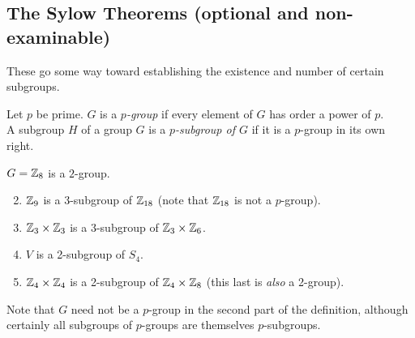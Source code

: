 \clearpage

\iffalse

\subsection{The Sylow Theorems (optional and non-examinable)}

These go some way toward establishing the existence and number of certain subgroups.

\begin{defn}{}{}
	Let $p$ be prime. $G$ is a \emph{$p$-group} if every element of $G$ has order a power of $p$.\\
A subgroup $H$ of a group $G$ is a \emph{$p$-subgroup of $G$} if it is a $p$-group in its own right.
\end{defn}

\begin{examples}{}{}
	\exstart $G=\mathbb{Z}_8$ is a $2$-group.
	\begin{enumerate}\setcounter{enumi}{1}
		\item $\mathbb{Z}_9$ is a 3-subgroup of $\mathbb{Z}_{18}$ (note that $\mathbb{Z}_{18}$ is not a $p$-group).
		\item $\mathbb{Z}_3\times\mathbb{Z}_3$ is a 3-subgroup of $\mathbb{Z}_3\times\mathbb{Z}_6$.
		\item $V$ is a 2-subgroup of $S_4$.
		\item $\mathbb{Z}_4\times\mathbb{Z}_4$ is a 2-subgroup of $\mathbb{Z}_4\times\mathbb{Z}_8$ (this last is \emph{also} a 2-group).
	\end{enumerate}
\end{examples}

Note that $G$ need not be a $p$-group in the second part of the definition, although certainly all subgroups of $p$-groups are themselves $p$-subgroups.

% 
% 
% 



